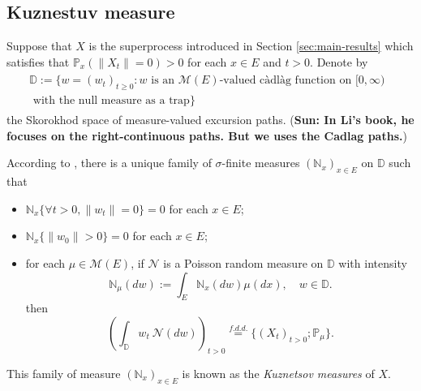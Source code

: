 \documentclass[12pt,a4paper]{amsart}
\numberwithin{equation}{section}
\theoremstyle{plain}
\theoremstyle{definition}
\begin{document}
\subsection{Kuznestuv measure}
Suppose that $X$ is the superprocess introduced in Section \ref{sec:main-results} which satisfies that $\mathbb P_{x}(\|X_t\| = 0)>0$ for each $x\in E$ and $t>0$. Denote by
\begin{align} 
\begin{multlined} \mathbb D:=\{ w= (w_t)_{t\geq 0}: w \text{ is an $\mathcal M(E)$-valued c\`{a}dl\`{a}g function on $[0,\infty)$ }
	\\ \text{ with the null measure as a trap} \} \end{multlined}
\end{align}
the Skorokhod space of measure-valued excursion paths.
({\bf Sun: In Li's book, he focuses on the right-continuous paths. 
But we uses the Cadlag paths.}) 

According to \cite[Section 8.4]{Li2011Measurevalued}, there is a unique family of $\sigma$-finite measures $(\mathbb N_x)_{x\in E}$ on $\mathbb D$ such that
\begin{itemize}
\item
  $\mathbb N_x \{\forall t > 0, \|w_t\| =0\} =0$ for each $x\in E$;
\item
  $\mathbb N_x \{ \|w_0\| > 0\} = 0$ for each $x\in E$;
\item
  for each $\mu \in \mathcal M(E)$, if $\mathcal N$ is a Poisson random measure on $\mathbb D$ with intensity
  \[
    \mathbb N_\mu(dw):= \int_E \mathbb N_x(dw)\mu(dx), \quad w\in \mathbb D.
  \]
	then
  \[
    \left(\int_{\mathbb D} w_t~\mathcal N(dw)\right)_{t> 0}
    \overset{f.d.d.}{=} \{(X_t)_{t> 0};\mathbb P_\mu\}.
\]
\end{itemize}
This family of measure $(\mathbb N_x)_{x\in E}$ is known as the \emph{Kuznetsov measures} of $X$.

\end{document}
